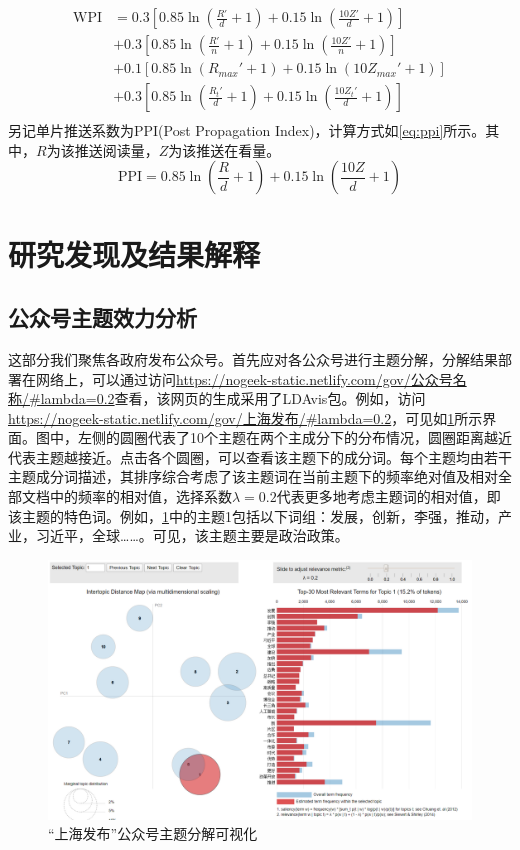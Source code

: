 \documentclass[a4paper,12pt,UTF8]{article}
\begin{document}
    \begin{equation}
      \label{eq:wpi}
      \begin{aligned}
        \text{WPI} &= 0.3\left[0.85 \ln (\frac{R'}{d} + 1)+ 0.15 \ln (\frac{10Z'}{d} + 1)\right] \\
                   &+ 0.3\left[0.85 \ln (\frac{R'}{n} + 1)+ 0.15 \ln (\frac{10Z'}{n} + 1)\right] \\
                   &+ 0.1\left[0.85 \ln (R_{max}' + 1)+ 0.15 \ln (10Z_{max}' + 1)\right] \\
                   &+ 0.3\left[0.85 \ln (\frac{R_t'}{d} + 1)+ 0.15 \ln (\frac{10Z_t'}{d} + 1)\right] \\
      \end{aligned}
    \end{equation}
    另记单片推送系数为PPI(Post Propagation Index)，计算方式如\cref{eq:ppi}所示。其中，$R$为该推送阅读量，$Z$为该推送在看量。
    \begin{equation}
      \label{eq:ppi}
      \text{PPI} = 0.85 \ln (\frac{R}{d} + 1)+ 0.15 \ln (\frac{10Z}{d} + 1)
    \end{equation}
    \section{研究发现及结果解释}
    \subsection{公众号主题效力分析}
    这部分我们聚焦各政府发布公众号。首先应对各公众号进行主题分解\cite{text2vec}，分解结果部署在网络上，可以通过访问\url{https://nogeek-static.netlify.com/gov/公众号名称/#lambda=0.2}查看，该网页的生成采用了LDAvis包\cite{sievert2014ldavis}。例如，访问\url{https://nogeek-static.netlify.com/gov/上海发布/#lambda=0.2}，可见如\cref{fig:shanghai-vis}所示界面。图中，左侧的圆圈代表了10个主题在两个主成分下的分布情况，圆圈距离越近代表主题越接近。点击各个圆圈，可以查看该主题下的成分词。每个主题均由若干主题成分词描述，其排序综合考虑了该主题词在当前主题下的频率绝对值及相对全部文档中的频率的相对值，选择系数$\lambda=0.2$代表更多地考虑主题词的相对值，即该主题的特色词。例如，\cref{fig:shanghai-vis}中的主题1包括以下词组：发展，创新，李强，推动，产业，习近平，全球……。可见，该主题主要是政治政策。
  
    \begin{figure}
      \centering
      \includegraphics[width=0.9\linewidth]{shanghai-vis.png}
      \caption{“上海发布”公众号主题分解可视化}
      \label{fig:shanghai-vis}
    \end{figure}
\end{document}
